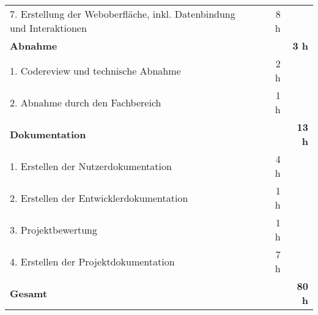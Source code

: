 \begin{tabularx}{\textwidth}{Xrrr}
7. Erstellung der Weboberfläche, inkl. Datenbindung und Interaktionen & & 8 h &\\
\rowcolor{heading}\textbf{Abnahme} & \textbf{} & \textbf{} & \textbf{3 h}\\
1. Codereview und technische Abnahme & & 2 h &\\
\rowcolor{odd}2. Abnahme durch den Fachbereich & & 1 h &\\
\rowcolor{heading}\textbf{Dokumentation} & \textbf{} & \textbf{} & \textbf{13 h}\\
1. Erstellen der Nutzerdokumentation & & 4 h &\\
\rowcolor{odd}2. Erstellen der Entwicklerdokumentation & & 1 h &\\
3. Projektbewertung & & 1 h &\\
\rowcolor{odd}4. Erstellen der Projektdokumentation & & 7 h &\\
\hline
\hline
\rowcolor{heading}\textbf{Gesamt} & \textbf{} & \textbf{} & \textbf{80 h}\\
\end{tabularx}
